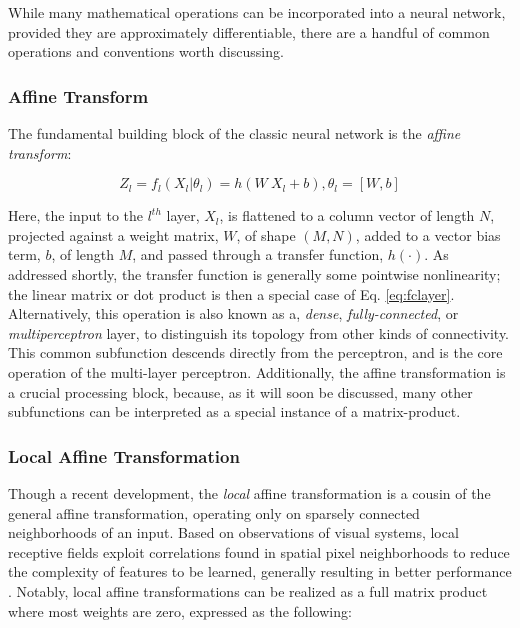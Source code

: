 While many mathematical operations can be incorporated into a neural network, provided they are approximately differentiable, there are a handful of common operations and conventions worth discussing.

\subsubsection{Affine Transform}

The fundamental building block of the classic neural network is the \emph{affine transform}:

\begin{equation}
\label{eq:fclayer}
Z_l = f_l(X_l \vert \theta_l) = h( W~X_{l} + b), \theta_l = [W, b]
\end{equation}

\noindent Here, the input to the $l^{th}$ layer, $X_l$, is flattened to a column vector of length $N$, projected against a weight matrix, $W$, of shape $(M, N)$, added to a vector bias term, $b$, of length $M$, and passed through a transfer function, $h(\cdot)$.
As addressed shortly, the transfer function is generally some pointwise nonlinearity;
the linear matrix or dot product is then a special case of Eq. \ref{eq:fclayer}.
Alternatively, this operation is also known as a, \emph{dense}, \emph{fully-connected}, or \emph{multiperceptron} layer, to distinguish its topology from other kinds of connectivity.
This common subfunction descends directly from the perceptron, and is the core operation of the multi-layer perceptron.
Additionally, the affine transformation is a crucial processing block, because, as it will soon be discussed, many other subfunctions can be interpreted as a special instance of a matrix-product.


\subsubsection{Local Affine Transformation}

Though a recent development, the \emph{local} affine transformation \cite{someone} is a cousin of the general affine transformation, operating only on sparsely connected neighborhoods of an input.
Based on observations of visual systems, local receptive fields exploit correlations found in spatial pixel neighborhoods to reduce the complexity of features to be learned, generally resulting in better performance \cite{who}.
Notably, local affine transformations can be realized as a full matrix product where most weights are zero, expressed as the following:

